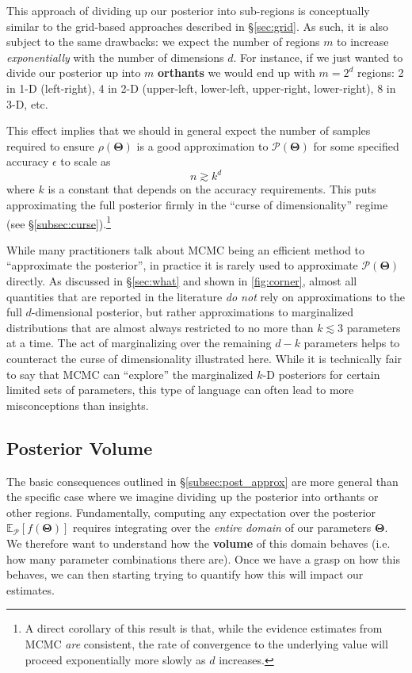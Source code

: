 \documentclass[12pt, titlepage]{article}
\newcommand{\meanwrt}[2]{\ensuremath{\mathbb{E}_{{#2}}\left[{#1}\right]}}
\newcommand{\params}{\ensuremath{\boldsymbol\Theta}}
\newcommand{\posterior}{\ensuremath{\mathcal{P}}}
\begin{document}
This approach of dividing up our posterior into sub-regions
is conceptually similar to the grid-based approaches
described in \S\ref{sec:grid}. As such,
it is also subject to the same drawbacks:
we expect the number of regions $m$ to increase
\textit{exponentially} with the number of dimensions $d$.
For instance, if we just wanted to divide our posterior up
into $m$ \textbf{orthants} we would end up with $m=2^d$ regions:
2 in 1-D (left-right), 4 in 2-D (upper-left, lower-left,
upper-right, lower-right), 8 in 3-D, etc.

This effect implies that we should in general expect
the number of samples required to ensure $\rho(\params)$ is a good
approximation to $\posterior(\params)$ for some specified accuracy $\epsilon$
to scale as
\begin{equation}
    n \gtrsim k^d
\end{equation}
where $k$ is a constant that depends on the accuracy requirements.
This puts approximating the full posterior firmly in the 
``curse of dimensionality'' regime (see \S\ref{subsec:curse}).\footnote{
A direct corollary of this result is that, while the
evidence estimates from MCMC \textit{are} consistent, 
the rate of convergence to the underlying value 
will proceed exponentially more slowly
as $d$ increases.}

While many practitioners talk about MCMC being 
an efficient method to ``approximate the posterior'', in practice it is rarely
used to approximate $\posterior(\params)$ directly.
As discussed in \S\ref{sec:what} and shown in
{\color{red} \autoref{fig:corner}}, almost all quantities 
that are reported in the literature \textit{do not} rely on approximations to
the full $d$-dimensional posterior, but rather approximations to marginalized
distributions that are almost always restricted to no more 
than $k\lesssim3$ parameters at a time.
The act of marginalizing over the remaining $d-k$ parameters
helps to counteract the curse of dimensionality illustrated here.
While it is technically fair to say that MCMC can ``explore'' 
the marginalized $k$-D posteriors for certain limited sets of parameters, 
this type of language can often lead to more misconceptions than insights.

\subsection{Posterior Volume} \label{subsec:volume}

The basic consequences outlined in \S\ref{subsec:post_approx} 
are more general than the specific case where we imagine dividing
up the posterior into orthants or other regions.
Fundamentally, computing any expectation
over the posterior $\meanwrt{f(\params)}{\posterior}$ requires
integrating over the \textit{entire domain} of our parameters 
$\params$. We therefore want to understand how the \textbf{volume}
of this domain behaves (i.e. how many parameter combinations there are).
Once we have a grasp on how this behaves, we can then starting trying
to quantify how this will impact our estimates.
\end{document}
